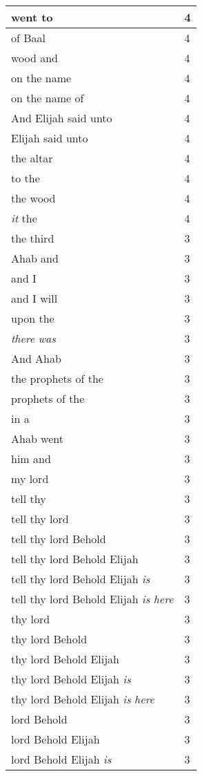 \begin{center}
\begin{longtable}{|p{3.0in}|p{0.5in}|}
went to & 4\\ \hline 
of Baal & 4\\ \hline 
wood and & 4\\ \hline 
on the name & 4\\ \hline 
on the name of & 4\\ \hline 
And Elijah said unto & 4\\ \hline 
Elijah said unto & 4\\ \hline 
the altar & 4\\ \hline 
to the & 4\\ \hline 
the wood & 4\\ \hline 
\emph{it} the & 4\\ \hline 
the third & 3\\ \hline 
Ahab and & 3\\ \hline 
and I & 3\\ \hline 
and I will & 3\\ \hline 
upon the & 3\\ \hline 
\emph{there} \emph{was} & 3\\ \hline 
And Ahab & 3\\ \hline 
the prophets of the & 3\\ \hline 
prophets of the & 3\\ \hline 
in a & 3\\ \hline 
Ahab went & 3\\ \hline 
him and & 3\\ \hline 
my lord & 3\\ \hline 
tell thy & 3\\ \hline 
tell thy lord & 3\\ \hline 
tell thy lord Behold & 3\\ \hline 
tell thy lord Behold Elijah & 3\\ \hline 
tell thy lord Behold Elijah \emph{is} & 3\\ \hline 
tell thy lord Behold Elijah \emph{is} \emph{here} & 3\\ \hline 
thy lord & 3\\ \hline 
thy lord Behold & 3\\ \hline 
thy lord Behold Elijah & 3\\ \hline 
thy lord Behold Elijah \emph{is} & 3\\ \hline 
thy lord Behold Elijah \emph{is} \emph{here} & 3\\ \hline 
lord Behold & 3\\ \hline 
lord Behold Elijah & 3\\ \hline 
lord Behold Elijah \emph{is} & 3\\ \hline 

\end{longtable}
\end{center}
